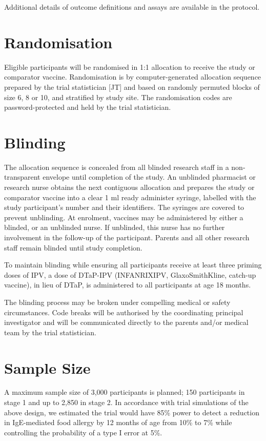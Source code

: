 \documentclass{bmcart}
\begin{document}
Additional details of outcome definitions and assays are available in the protocol.

\section*{Randomisation}

Eligible participants will be randomised in 1:1 allocation to receive the study or comparator vaccine.
Randomisation is by computer-generated allocation sequence prepared by the trial statistician [JT] and based on randomly permuted blocks of size 6, 8 or 10, and stratified by study site.
The randomisation codes are password-protected and held by the trial statistician.

\section*{Blinding}

The allocation sequence is concealed from all blinded research staff in a non-transparent envelope until completion of the study.
An unblinded pharmacist or research nurse obtains the next contiguous allocation and prepares the study or comparator vaccine into a clear 1 ml ready administer syringe, labelled with the study participant's number and their identifiers.
The syringes are covered to prevent unblinding.
At enrolment, vaccines may be administered by either a blinded, or an unblinded nurse.
If unblinded, this nurse has no further involvement in the follow-up of the participant.
Parents and all other research staff remain blinded until study completion.

To maintain blinding while ensuring all participants receive at least three priming doses of IPV, a dose of DTaP-IPV (INFANRIX\textregistered IPV, GlaxoSmithKline, catch-up vaccine), in lieu of DTaP, is administered to all participants at age 18 months.

The blinding process may be broken under compelling medical or safety circumstances. 
Code breaks will be authorised by the coordinating principal investigator and will be communicated directly to the parents and/or medical team by the trial statistician.

\section*{Sample Size}

A maximum sample size of 3,000 participants is planned; 150 participants in stage 1 and up to 2,850 in stage 2.
In accordance with trial simulations of the above design, we estimated the trial would have 85\% power to detect a reduction in IgE-mediated food allergy by 12 months of age from 10\% to 7\% while controlling the probability of a type I error at 5\%.
\end{document}
